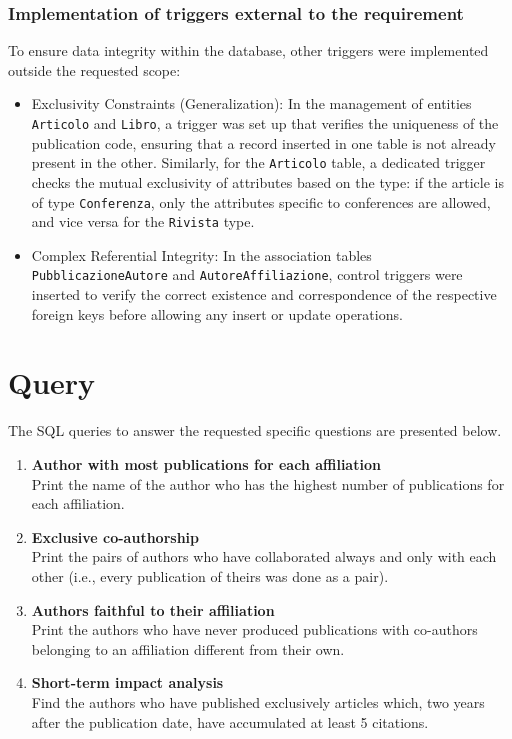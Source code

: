 \documentclass[a4paper,12pt]{article}
\begin{document}
\subsubsection{Implementation of triggers external to the requirement}
To ensure data integrity within the database, other triggers were implemented outside the requested scope:
\begin{itemize}
    \item Exclusivity Constraints (Generalization): In the management of entities \texttt{Articolo} and \texttt{Libro}, a trigger was set up that verifies the uniqueness of the publication code, ensuring that a record inserted in one table is not already present in the other. Similarly, for the \texttt{Articolo} table, a dedicated trigger checks the mutual exclusivity of attributes based on the type: if the article is of type \texttt{Conferenza}, only the attributes specific to conferences are allowed, and vice versa for the \texttt{Rivista} type.
    \item Complex Referential Integrity: In the association tables \texttt{PubblicazioneAutore} and \texttt{AutoreAffiliazione}, control triggers were inserted to verify the correct existence and correspondence of the respective foreign keys before allowing any insert or update operations.
\end{itemize}
\section{Query} \label{sec:query}
The SQL queries to answer the requested specific questions are presented below.
\begin{enumerate}[label=\textbf{Q\arabic*}, start=1, leftmargin=1.5cm]
    \item \textbf{Author with most publications for each affiliation} \\
    Print the name of the author who has the highest number of publications for each affiliation.
    
    \item \textbf{Exclusive co-authorship} \\
    Print the pairs of authors who have collaborated always and only with each other (i.e., every publication of theirs was done as a pair).
    
    \item \textbf{Authors faithful to their affiliation} \\
    Print the authors who have never produced publications with co-authors belonging to an affiliation different from their own.
    
    \item \textbf{Short-term impact analysis} \\
    Find the authors who have published exclusively articles which, two years after the publication date, have accumulated at least 5 citations.
\end{enumerate}
\end{document}
